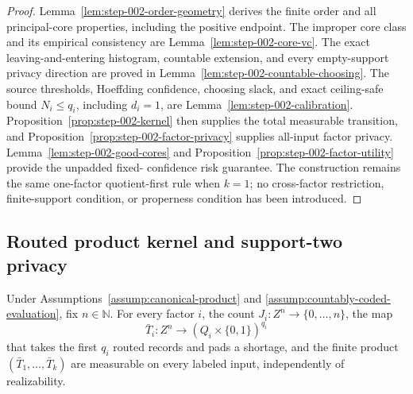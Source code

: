 \begin{proof}
Lemma~\ref{lem:step-002-order-geometry} derives the finite order and all
principal-core properties, including the positive endpoint.  The improper
core class and its empirical consistency are
Lemma~\ref{lem:step-002-core-vc}.  The exact leaving-and-entering histogram,
countable extension, and every empty-support privacy direction are proved in
Lemma~\ref{lem:step-002-countable-choosing}.  The source thresholds,
Hoeffding confidence, choosing slack, and exact ceiling-safe bound
\(N_i\le q_i\), including \(d_i=1\), are
Lemma~\ref{lem:step-002-calibration}.  Proposition~\ref{prop:step-002-kernel}
then supplies the total measurable transition, and
Proposition~\ref{prop:step-002-factor-privacy} supplies all-input factor
privacy.  Lemma~\ref{lem:step-002-good-cores} and
Proposition~\ref{prop:step-002-factor-utility} provide the unpadded fixed-
confidence risk guarantee.  The construction remains the same one-factor
quotient-first rule when \(k=1\); no cross-factor restriction, finite-support
condition, or properness condition has been introduced.
\end{proof}

\subsection{Routed product kernel and support-two privacy}
\label{app:step-003}

\begin{lemma}
\label{lem:step-003-routing-measurability}
Under Assumptions~\ref{assump:canonical-product} and
\ref{assump:countably-coded-evaluation}, fix \(n\in\mathbb N\).  For every
factor \(i\), the count \(J_i:Z^n\to\{0,\ldots,n\}\), the map
\[
\bar T_i:Z^n\longrightarrow(Q_i\times\{0,1\})^{q_i}
\]
that takes the first \(q_i\) routed records and pads a shortage, and the
finite product \((\bar T_1,\ldots,\bar T_k)\) are measurable on every
labeled input, independently of realizability.
\end{lemma}

